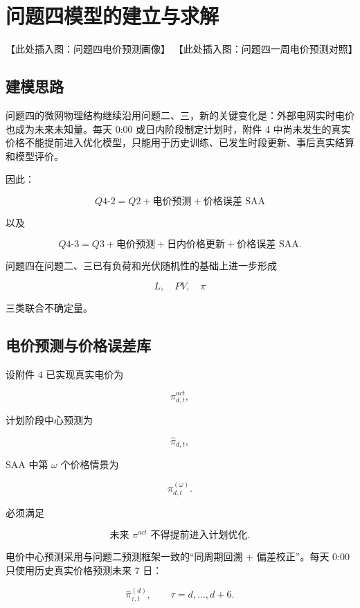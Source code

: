 \section{问题四模型的建立与求解}
【此处插入图：问题四电价预测画像】
【此处插入图：问题四一周电价预测对照】

\subsection{建模思路}

问题四的微网物理结构继续沿用问题二、三，新的关键变化是：外部电网实时电价也成为未来未知量。每天 0:00 或日内阶段制定计划时，附件 4 中尚未发生的真实价格不能提前进入优化模型，只能用于历史训练、已发生时段更新、事后真实结算和模型评价。

因此：

\[
\boxed{
Q4\text{-}2
=
Q2
+
\text{电价预测}
+
\text{价格误差 SAA}
}
\]

以及

\[
\boxed{
Q4\text{-}3
=
Q3
+
\text{电价预测}
+
\text{日内价格更新}
+
\text{价格误差 SAA}
}.
\]

问题四在问题二、三已有负荷和光伏随机性的基础上进一步形成

\[
L,\quad PV,\quad \pi
\]

三类联合不确定量。

\subsection{电价预测与价格误差库}

设附件 4 已实现真实电价为

\[
\pi^{act}_{d,t},
\]

计划阶段中心预测为

\[
\hat\pi_{d,t},
\]

SAA 中第 \(\omega\) 个价格情景为

\[
\pi^{(\omega)}_{d,t}.
\]

必须满足

\begin{equation}
\boxed{
\text{未来 }\pi^{act}\text{ 不得提前进入计划优化}
}.
\end{equation}

电价中心预测采用与问题二预测框架一致的“同周期回溯 + 偏差校正”。每天 0:00 只使用历史真实价格预测未来 7 日：

\begin{equation}
\hat\pi_{\tau,t}^{(d)},
\qquad
\tau=d,\ldots,d+6.
\end{equation}

